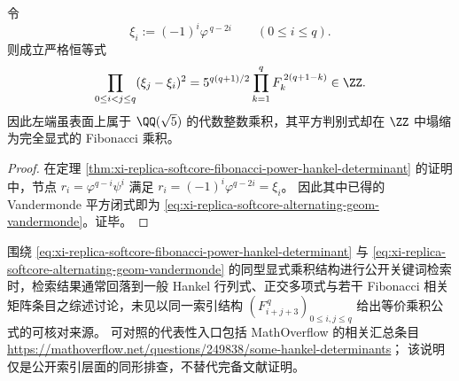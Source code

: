 \begin{corollary}\label{cor:xi-replica-softcore-alternating-geom-vandermonde}
令
\[
\xi_i:=(-1)^i\varphi^{\,q-2i}\qquad(0\le i\le q).
\]
则成立严格恒等式
\begin{equation}\label{eq:xi-replica-softcore-alternating-geom-vandermonde}
\prod_{0\le i<j\le q}(\xi_j-\xi_i)^2
=5^{q(q+1)/2}\prod_{k=1}^{q}F_k^{\,2(q+1-k)}\in\ZZ.
\end{equation}
因此左端虽表面上属于 \(\QQ(\sqrt5)\) 的代数整数乘积，其平方判别式却在 \(\ZZ\) 中塌缩为完全显式的 Fibonacci 乘积。
\end{corollary}
\begin{proof}
在定理 \ref{thm:xi-replica-softcore-fibonacci-power-hankel-determinant} 的证明中，节点 \(r_i=\varphi^{q-i}\psi^i\) 满足
\(
r_i=(-1)^i\varphi^{q-2i}=\xi_i
\)。
因此其中已得的 Vandermonde 平方闭式即为 \eqref{eq:xi-replica-softcore-alternating-geom-vandermonde}。证毕。
\end{proof}

\begin{remark}[公开索引同形排查说明]\label{rem:xi-replica-softcore-hankel-vandermonde-public-index-note}
围绕 \eqref{eq:xi-replica-softcore-fibonacci-power-hankel-determinant} 与 \eqref{eq:xi-replica-softcore-alternating-geom-vandermonde} 的同型显式乘积结构进行公开关键词检索时，检索结果通常回落到一般 Hankel 行列式、正交多项式与若干 Fibonacci 相关矩阵条目之综述讨论，未见以同一索引结构 \((F_{i+j+3}^{\,q})_{0\le i,j\le q}\) 给出等价乘积公式的可核对来源。
可对照的代表性入口包括 MathOverflow 的相关汇总条目 \url{https://mathoverflow.net/questions/249838/some-hankel-determinants}；
该说明仅是公开索引层面的同形排查，不替代完备文献证明。
\end{remark}

